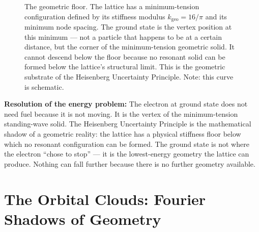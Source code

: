 \documentclass[11pt, letterpaper, openany]{book}
\begin{document}
\begin{figure}[H]
\centering
{}
\caption{The geometric floor. The lattice has a minimum-tension
configuration defined by its stiffness modulus $k_{\text{geo}} =
16/\pi$ and its minimum node spacing. The ground state is the
vertex position at this minimum — not a particle that happens to
be at a certain distance, but the corner of the minimum-tension
geometric solid. It cannot descend below the floor because no
resonant solid can be formed below the lattice's structural limit.
This is the geometric substrate of the Heisenberg Uncertainty
Principle. Note: this curve is schematic.}
\end{figure}

\begin{resolutionbox}
\textbf{Resolution of the energy problem:}
The electron at ground state does not need fuel because it is not
moving. It is the vertex of the minimum-tension standing-wave solid.
The Heisenberg Uncertainty Principle is the mathematical shadow of
a geometric reality: the lattice has a physical stiffness floor
below which no resonant configuration can be formed. The ground
state is not where the electron ``chose to stop'' — it is the
lowest-energy geometry the lattice can produce. Nothing can fall
further because there is no further geometry available.
\end{resolutionbox}

\section{The Orbital Clouds: Fourier Shadows of Geometry}
\end{document}
